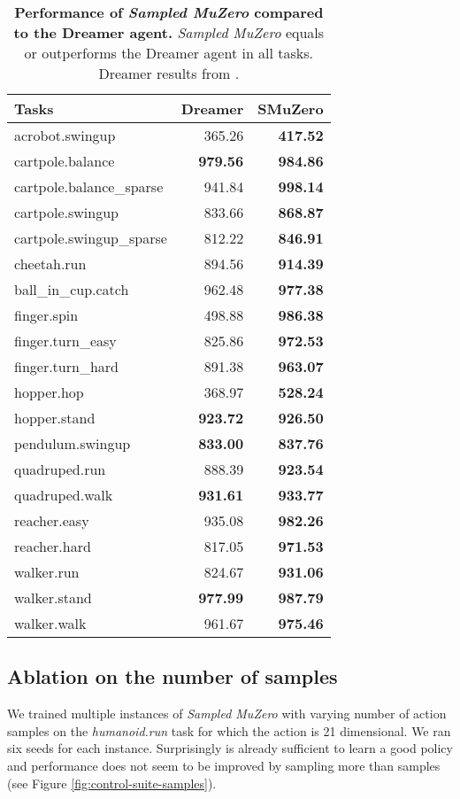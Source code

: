\documentclass{article}
\newcommand{\smuzero}{\emph{Sampled MuZero}}
\begin{document}
\begin{table}[t]
\begin{tabularx}{\columnwidth}{l rr}

\toprule
Tasks & Dreamer & SMuZero \\
\midrule
acrobot.swingup & 365.26 & \textbf{417.52}\\
cartpole.balance & \textbf{979.56} & \textbf{984.86}\\
cartpole.balance\_sparse & 941.84 & \textbf{998.14}\\
cartpole.swingup & 833.66 & \textbf{868.87}\\
cartpole.swingup\_sparse & 812.22 & \textbf{846.91}\\
cheetah.run & 894.56 & \textbf{914.39}\\
ball\_in\_cup.catch & 962.48 & \textbf{977.38}\\
finger.spin & 498.88 & \textbf{986.38}\\
finger.turn\_easy & 825.86 & \textbf{972.53}\\
finger.turn\_hard & 891.38 & \textbf{963.07}\\
hopper.hop & 368.97 & \textbf{528.24}\\
hopper.stand & \textbf{923.72} & \textbf{926.50}\\
pendulum.swingup & \textbf{833.00} & \textbf{837.76}\\
quadruped.run & 888.39 & \textbf{923.54}\\
quadruped.walk & \textbf{931.61} & \textbf{933.77}\\
reacher.easy & 935.08 & \textbf{982.26}\\
reacher.hard & 817.05 & \textbf{971.53}\\
walker.run & 824.67 & \textbf{931.06}\\
walker.stand & \textbf{977.99} & \textbf{987.79}\\
walker.walk & 961.67 & \textbf{975.46}\\
\bottomrule
\end{tabularx}
 
\caption{
\label{tab:dreamer-results}
\textbf{Performance of \smuzero{} compared to the Dreamer agent.} \smuzero{} equals or outperforms the Dreamer agent in all tasks. Dreamer results from \cite{hafner2019dream}.
}
\end{table}

\subsection{Ablation on the number of samples}
We trained multiple instances of \smuzero{} with varying number of action samples  on the \emph{humanoid.run} task for which the action is 21 dimensional. We ran six seeds for each instance. Surprisingly  is already sufficient to learn a good policy and performance does not seem to be improved by sampling more than  samples (see Figure \ref{fig:control-suite-samples}).
\end{document}
